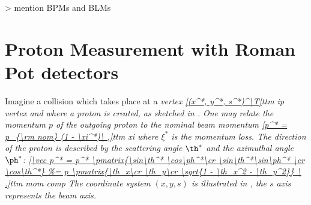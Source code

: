 \>> mention BPMs and BLMs



\iffalse
\bmfig
\fig[8cm]{fig/external/RP_stations_original.pdf}{rp stations}{[7cm]RP stations}
\fig[6cm]{fig/external/rp_unit.jpg}{rp unit}{[7cm]RP unit}
\emfig

\bmfig
\fig[6cm]{fig/external/rp.jpg}{rp rp}{[7cm]A Roman Pot}
\fig[6cm]{fig/external/rp_package.jpg}{rp package}{[7cm]Detector package}
\emfig

\bmfig
\fig[6cm]{fig/external/hybrid2.jpg}{rp hybrid}{[7cm]A hybrid with a silicon detector and four VFAT chips.}
\fig[6cm]{fig/external/silicon_explained.png}{rp sensor}{[7cm]A detail of a silicon sensor.}
\emfig
\fi

\section[rp measurement]{Proton Measurement with Roman Pot detectors}



Imagine a collision which takes place at a \em{vertex}
\eqref{(x^*, y^*, s^*)^\T}{ttm ip vertex}
and where a proton is created, as sketched in . One may relate the momentum $p$ of the outgoing proton to the nominal beam momentum
\eqref{p^* = p_{\rm nom} (1 - \xi^*)\ ,}{ttm xi}
where $\xi^*$ is the \em{momentum loss}. The direction of the proton is described by the \em{scattering angle} $\th^*$ and the \em{azimuthal angle} $\ph^*$:
\eqref{\vec p^* = p^* \pmatrix{\sin\th^* \cos\ph^*\cr \sin\th^*\sin\ph^* \cr \cos\th^*}
\ .}{ttm mom comp}
The coordinate system $(x, y, s)$ is illustrated in , the $s$ axis represents the beam axis.

